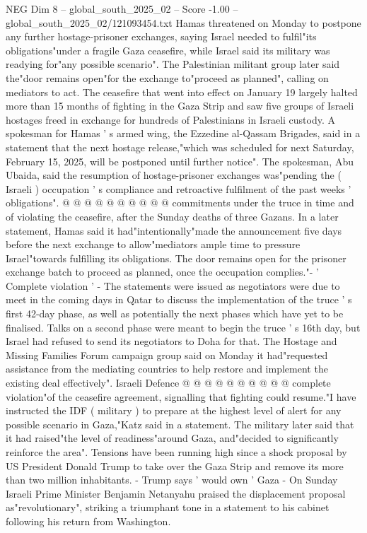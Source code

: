 \begin{textsample}{NEG Dim 8 – global\_south\_2025\_02 – Score -1.00 – global\_south\_2025\_02/121093454.txt}  \label{ex:f8_neg_070}
Hamas threatened on Monday to postpone any further hostage-prisoner exchanges, saying Israel needed to fulfil"its obligations"under a fragile Gaza ceasefire, while Israel said its military was readying for"any possible scenario".
The Palestinian militant group later said the"door remains open"for the exchange to"proceed as planned", calling on mediators to act.
The ceasefire that went into effect on January 19 largely halted more than 15 months of fighting in the Gaza Strip and saw five groups of Israeli hostages freed in exchange for hundreds of Palestinians in Israeli custody.
A spokesman for Hamas ' s armed wing, the Ezzedine al-Qassam Brigades, said in a statement that the next hostage release,"which was scheduled for next Saturday, February 15, 2025, will be postponed until further notice".
The spokesman, Abu Ubaida, said the resumption of hostage-prisoner exchanges was"pending the ( Israeli ) occupation ' s compliance and retroactive fulfilment of the past weeks ' obligations". @ @ @ @ @ @ @ @ @ @ commitments under the truce in time and of violating the ceasefire, after the Sunday deaths of three Gazans.
In a later statement, Hamas said it had"intentionally"made the announcement five days before the next exchange to allow"mediators ample time to pressure Israel"towards fulfilling its obligations.
The door remains open for the prisoner exchange batch to proceed as planned, once the occupation complies."- ' Complete violation ' - The statements were issued as negotiators were due to meet in the coming days in Qatar to discuss the implementation of the truce ' s first 42-day phase, as well as potentially the next phases which have yet to be finalised.
Talks on a second phase were meant to begin the truce ' s 16th day, but Israel had refused to send its negotiators to Doha for that.
The Hostage and Missing Families Forum campaign group said on Monday it had"requested assistance from the mediating countries to help restore and implement the existing deal effectively".
Israeli Defence @ @ @ @ @ @ @ @ @ @ complete violation"of the ceasefire agreement, signalling that fighting could resume."I have instructed the IDF ( military ) to prepare at the highest level of alert for any possible scenario in Gaza,"Katz said in a statement.
The military later said that it had raised"the level of readiness"around Gaza, and"decided to significantly reinforce the area".
Tensions have been running high since a shock proposal by US President Donald Trump to take over the Gaza Strip and remove its more than two million inhabitants. - Trump says ' would own ' Gaza - On Sunday Israeli Prime Minister Benjamin Netanyahu praised the displacement proposal as"revolutionary", striking a triumphant tone in a statement to his cabinet following his return from Washington.

\end{textsample}

